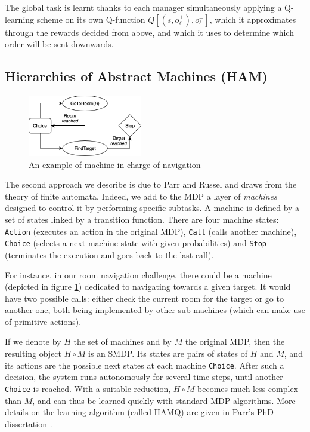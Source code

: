 \documentclass{article}
\begin{document}
The global task is learnt thanks to each manager simultaneously applying a Q-learning scheme on its own Q-function $Q[(s, o_{\ell}^+), o_{\ell}^-]$, which it approximates through the rewards decided from above, and which it uses to determine which order will be sent downwards.

\subsection{Hierarchies of Abstract Machines (HAM)}

\begin{figure}
\vspace{-1.5cm}
\includegraphics[width=5cm]{images/HAM.png}
\caption{An example of machine in charge of navigation}
\label{fig:HAM}
\end{figure}

The second approach we describe is due to Parr and Russel \cite{parr_reinforcement_1998} and draws from the theory of finite automata. Indeed, we add to the MDP a layer of \emph{machines} designed to control it by performing specific subtasks. A machine is defined by a set of states linked by a transition function. There are four machine states: \texttt{Action} (executes an action in the original MDP), \texttt{Call} (calls another machine), \texttt{Choice} (selects a next machine state with given probabilities) and \texttt{Stop} (terminates the execution and goes back to the last call).

For instance, in our room navigation challenge, there could be a machine (depicted in figure \ref{fig:HAM}) dedicated to navigating towards a given target. It would have two possible calls: either check the current room for the target or go to another one, both being implemented by other sub-machines (which can make use of primitive actions).

If we denote by $H$ the set of machines and by $M$ the original MDP, then the resulting object $H \circ M$ is an SMDP. Its states are pairs of states of $H$ and $M$, and its actions are the possible next states at each machine \texttt{Choice}. After such a decision, the system runs autonomously for several time steps, until another \texttt{Choice} is reached. With a suitable reduction,  $H \circ M$ becomes much less complex than $M$, and can thus be learned quickly with standard MDP algorithms. More details on the learning algorithm (called HAMQ) are given in Parr's PhD dissertation \cite{parr_hierarchical_1998}. 
\end{document}
